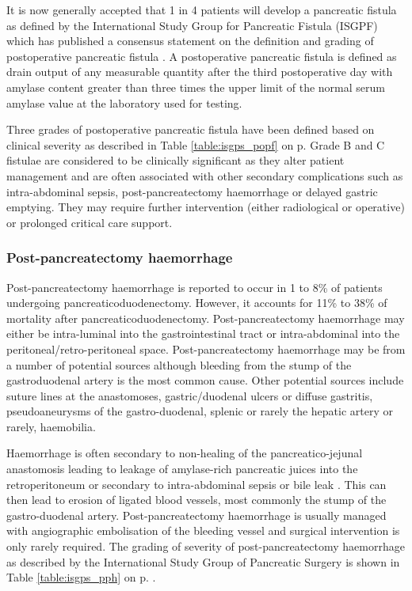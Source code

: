 It is now generally accepted that 1 in 4 patients will develop a pancreatic fistula as defined by the International Study Group for Pancreatic Fistula (ISGPF) which has published a consensus statement on the definition and grading of postoperative pancreatic fistula \parencite{bassi_postoperative_2005}. 
A postoperative pancreatic fistula is defined as drain output of any measurable quantity after the third postoperative day with amylase content greater than three times the upper limit of the normal serum amylase value at the laboratory used for testing. 

Three grades of postoperative pancreatic fistula have been defined based on clinical severity as described in Table \ref{table:isgps_popf} on p\pageref{table:isgps_popf}. 
Grade B and C fistulae are considered to be clinically significant as they alter patient management and are often associated with other secondary complications such as intra-abdominal sepsis, post-pancreatectomy haemorrhage or delayed gastric emptying. 
They may require further intervention (either radiological or operative) or prolonged critical care support. 

\subsubsection{Post-pancreatectomy haemorrhage}
\label{sec:ch_intro_PPH}
Post-pancreatectomy haemorrhage is reported to occur in 1 to 8\% of patients undergoing pancreaticoduodenectomy. 
However, it accounts for 11\% to 38\% of mortality after pancreaticoduodenectomy. 
Post-pancreatectomy haemorrhage may either be intra-luminal into the gastrointestinal tract or intra-abdominal into the peritoneal/retro-peritoneal space. 
Post-pancreatectomy haemorrhage may be from a number of potential sources although bleeding from the stump of the gastroduodenal artery is the most common cause. 
Other potential sources include suture lines at the anastomoses, gastric/duodenal ulcers or diffuse gastritis, pseudoaneurysms of the gastro-duodenal, splenic or rarely the hepatic artery or rarely, haemobilia.

Haemorrhage is often secondary to non-healing of the pancreatico-jejunal anastomosis leading to leakage of amylase-rich pancreatic juices into the retroperitoneum or secondary to intra-abdominal sepsis or bile leak \parencite{tien_risk_2005, koukoutsis_haemorrhage_2006, choi_delayed_2004, balladur_bleeding_1996}. 
This can then lead to erosion of ligated blood vessels, most commonly the stump of the gastro-duodenal artery. 
Post-pancreatectomy haemorrhage is usually managed with angiographic embolisation of the bleeding vessel and surgical intervention is only rarely required. 
The grading of severity of post-pancreatectomy haemorrhage as described by the International Study Group of Pancreatic Surgery \parencite{wente_postpancreatectomy_2007} is shown in Table \ref{table:isgps_pph} on p\pageref{table:isgps_pph}. .

